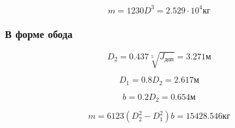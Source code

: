 \begin{equation}
	m = 1230 D^3 = 2.529 \cdot 10^4 кг
\end{equation}

\subsubsection{В форме обода}

\begin{equation}
	D_2 = 0.437 \sqrt[5]{J_{доп}} = 3.271 м
\end{equation}

\begin{equation}
D_1 = 0.8  D_2 = 2.617 м
\end{equation}

\begin{equation}
b = 0.2  D_2 = 0.654 м
\end{equation}

\begin{equation}
m = 6123(D_2^2 - D_1^2)b = 15428.546 кг
\end{equation}